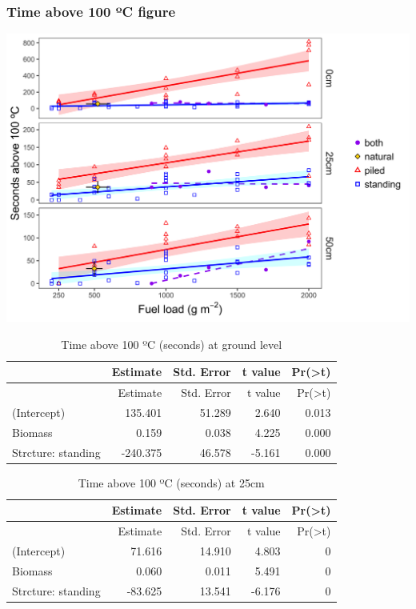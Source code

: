 \documentclass[11pt,a4paper]{article}
\begin{document}
\hypertarget{time-above-100-c-figure}{%
\subsubsection{Time above 100 ºC figure}\label{time-above-100-c-figure}}

\includegraphics{figures/compare_secsAbv100-1.png}

\begin{longtable}[]{@{}lrrrr@{}}
\caption{Time above 100 ºC (seconds) at ground level}\tabularnewline
\toprule
& Estimate & Std. Error & t value &
Pr(\textgreater{}\textbar{}t\textbar{})\tabularnewline
\midrule
\endfirsthead
\toprule
& Estimate & Std. Error & t value &
Pr(\textgreater{}\textbar{}t\textbar{})\tabularnewline
\midrule
\endhead
(Intercept) & 135.401 & 51.289 & 2.640 & 0.013\tabularnewline
Biomass & 0.159 & 0.038 & 4.225 & 0.000\tabularnewline
Strcture: standing & -240.375 & 46.578 & -5.161 & 0.000\tabularnewline
\bottomrule
\end{longtable}

\begin{longtable}[]{@{}lrrrr@{}}
\caption{Time above 100 ºC (seconds) at 25cm}\tabularnewline
\toprule
& Estimate & Std. Error & t value &
Pr(\textgreater{}\textbar{}t\textbar{})\tabularnewline
\midrule
\endfirsthead
\toprule
& Estimate & Std. Error & t value &
Pr(\textgreater{}\textbar{}t\textbar{})\tabularnewline
\midrule
\endhead
(Intercept) & 71.616 & 14.910 & 4.803 & 0\tabularnewline
Biomass & 0.060 & 0.011 & 5.491 & 0\tabularnewline
Strcture: standing & -83.625 & 13.541 & -6.176 & 0\tabularnewline
\bottomrule
\end{longtable}
\end{document}
